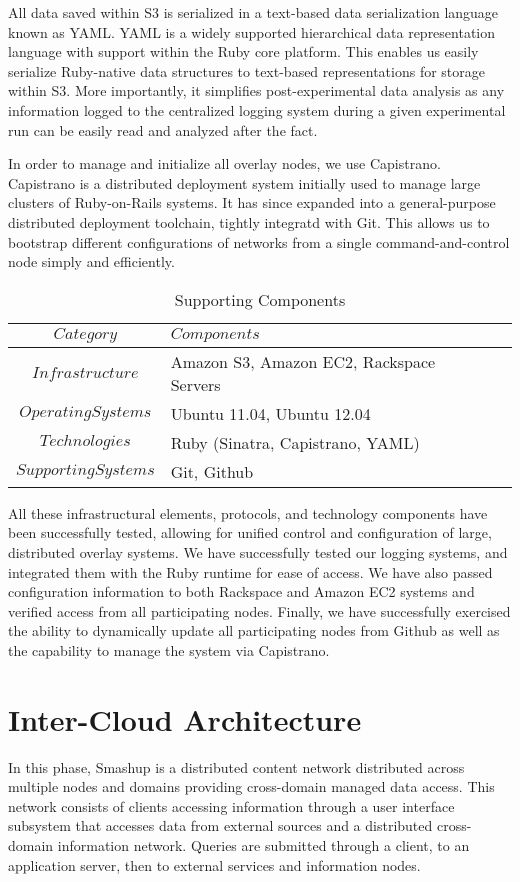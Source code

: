 All data saved within S3 is serialized in a text-based data serialization language known as YAML.  YAML is a widely supported hierarchical data representation language with support within the Ruby core platform.  This enables us easily serialize Ruby-native data structures to text-based representations for storage within S3.  More importantly, it simplifies post-experimental data analysis as any information logged to the centralized logging system during a given experimental run can be easily read and analyzed after the fact.

In order to manage and initialize all overlay nodes, we use Capistrano.  Capistrano is a distributed deployment system initially used to manage large clusters of Ruby-on-Rails systems.  It has since expanded into a general-purpose distributed deployment toolchain, tightly integratd with Git.  This allows us to bootstrap different configurations of networks from a single command-and-control node simply and efficiently.

\begin{table*}[tp] %
\centering %
\begin{tabular}{clcc}
\toprule %
$Category$ 				& $Components$ 								\\\toprule %
$Infrastructure$ 		& Amazon S3, Amazon EC2, Rackspace Servers 	\\\midrule
$Operating Systems$		& Ubuntu 11.04, Ubuntu 12.04 				\\\midrule
$Technologies$			& Ruby (Sinatra, Capistrano, YAML) 			\\\midrule
$Supporting Systems$	& Git, Github 								\\\bottomrule
\end{tabular}
\caption{Supporting Components}
\label{table:model:components}
\end{table*}

All these infrastructural elements, protocols, and technology components have been successfully tested, allowing for unified control and configuration of large, distributed overlay systems.  We have successfully tested our logging systems, and integrated them with the Ruby runtime for ease of access.  We have also passed configuration information to both Rackspace and Amazon EC2 systems and verified access from all participating nodes.  Finally, we have successfully exercised the ability to dynamically update all participating nodes from Github as well as the capability to manage the system via Capistrano.

\section{Inter-Cloud Architecture}
In this phase, Smashup is a distributed content network distributed across multiple nodes and domains providing cross-domain managed data access.  This network consists of clients accessing information through a user interface subsystem that accesses data from external sources and a distributed cross-domain information network.  Queries are submitted through a client, to an application server, then to external services and information nodes.

